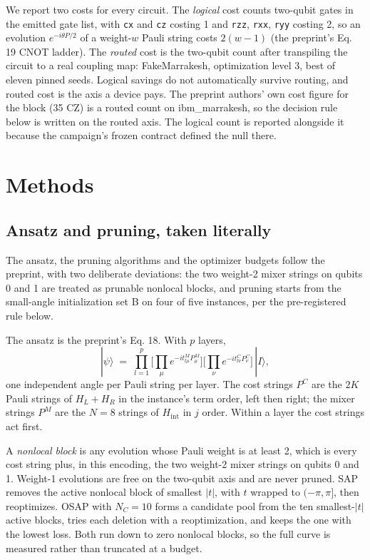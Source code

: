 \documentclass[11pt]{article}
\begin{document}
We report two costs for every circuit. The \emph{logical} cost counts two-qubit gates in the emitted gate list, with \texttt{cx} and \texttt{cz} costing 1 and \texttt{rzz}, \texttt{rxx}, \texttt{ryy} costing 2, so an evolution $e^{-i\theta P/2}$ of a weight-$w$ Pauli string costs $2(w-1)$ (the preprint's Eq. 19 CNOT ladder). The \emph{routed} cost is the two-qubit count after transpiling the circuit to a real coupling map: FakeMarrakesh, optimization level 3, best of eleven pinned seeds. Logical savings do not automatically survive routing, and routed cost is the axis a device pays. The preprint authors' own cost figure for the block (35 CZ) is a routed count on ibm\_marrakesh, so the decision rule below is written on the routed axis. The logical count is reported alongside it because the campaign's frozen contract defined the null there.

\section{Methods}

\subsection{Ansatz and pruning, taken literally}

The ansatz, the pruning algorithms and the optimizer budgets follow the preprint, with two deliberate deviations: the two weight-2 mixer strings on qubits 0 and 1 are treated as prunable nonlocal blocks, and pruning starts from the small-angle initialization set B on four of five instances, per the pre-registered rule below.

The ansatz is the preprint's Eq. 18. With $p$ layers,
\begin{equation}
|\psi\rangle \;=\; \prod_{l=1}^{p} \Big[\prod_{\mu} e^{-i t^{M}_{l\mu} P^{M}_{\mu}}\Big]\Big[\prod_{\nu} e^{-i t^{C}_{l\nu} P^{C}_{\nu}}\Big]\,|I\rangle ,
\end{equation}
one independent angle per Pauli string per layer. The cost strings $P^C$ are the $2K$ Pauli strings of $H_L + H_R$ in the instance's term order, left then right; the mixer strings $P^M$ are the $N = 8$ strings of $H_{\mathrm{int}}$ in $j$ order. Within a layer the cost strings act first.

A \emph{nonlocal block} is any evolution whose Pauli weight is at least 2, which is every cost string plus, in this encoding, the two weight-2 mixer strings on qubits 0 and 1. Weight-1 evolutions are free on the two-qubit axis and are never pruned. SAP removes the active nonlocal block of smallest $|t|$, with $t$ wrapped to $(-\pi,\pi]$, then reoptimizes. OSAP with $N_C = 10$ forms a candidate pool from the ten smallest-$|t|$ active blocks, tries each deletion with a reoptimization, and keeps the one with the lowest loss. Both run down to zero nonlocal blocks, so the full curve is measured rather than truncated at a budget.
\end{document}
